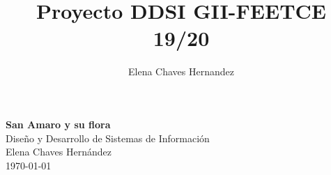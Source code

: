 \documentclass[10pt,a4paper]{article}
\author{Elena Chaves Hernandez}
\title{Proyecto DDSI GII-FEETCE 19/20}
\begin{document}
\renewcommand{\contentsname}{Contenidos}
\renewcommand{\refname}{Bibliografía}

\begin{titlepage}
\thispagestyle{empty}
\setlength{\unitlength}{1cm}
\vspace*{\fill}

\begin{center}
\textbf{{\Huge San Amaro y su flora}}\\\vspace{7.5cm}
{\Large Diseño y Desarrollo de Sistemas de Información}\\\vspace{1cm}
{\Large Elena Chaves Hernández}\\\vspace{1cm}
\today \vspace{1cm}

\begin{figure} [h!]
\end{figure}
\end{center}
\end{titlepage}

\newpage
\tableofcontents
\thispagestyle{empty} 
\newpage
\end{document}
